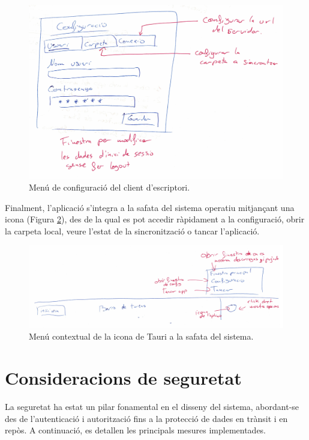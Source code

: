 \begin{itemize}
    \begin{figure}[H]
        \centering
        \includegraphics[width=\textwidth]{Figures/interficies/tauri-configuracio.jpg}
        \caption{Menú de configuració del client d'escriptori.}
        \label{fig:tauri_config}
    \end{figure}
\end{itemize}

Finalment, l'aplicació s'integra a la safata del sistema operatiu mitjançant una icona (Figura \ref{fig:tauri_icon}), des de la qual es pot accedir ràpidament a la configuració, obrir la carpeta local, veure l'estat de la sincronització o tancar l'aplicació.

\begin{figure}[H]
    \centering
    \includegraphics[width=\textwidth]{Figures/interficies/tauri-icon.jpg}
    \caption{Menú contextual de la icona de Tauri a la safata del sistema.}
    \label{fig:tauri_icon}
\end{figure}

\section{Consideracions de seguretat}
La seguretat ha estat un pilar fonamental en el disseny del sistema, abordant-se des de l'autenticació i autorització fins a la protecció de dades en trànsit i en repòs. A continuació, es detallen les principals mesures implementades.

